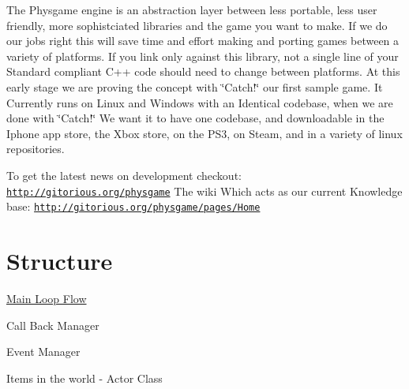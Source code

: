 The Physgame engine is an abstraction layer between less portable, less user friendly, more sophistciated libraries and the game you want to make. If we do our jobs right this will save time and effort making and porting games between a variety of platforms. If you link only against this library, not a single line of your Standard compliant C++ code should need to change between platforms. At this early stage we are proving the concept with \char`\"{}Catch!\char`\"{} our first sample game. It Currently runs on Linux and Windows with an Identical codebase, when we are done with \char`\"{}Catch!\char`\"{} We want it to have one codebase, and downloadable in the Iphone app store, the Xbox store, on the PS3, on Steam, and in a variety of linux repositories.

To get the latest news on development checkout: \href{http://gitorious.org/physgame}{\tt http://gitorious.org/physgame} The wiki Which acts as our current Knowledge base: \href{http://gitorious.org/physgame/pages/Home}{\tt http://gitorious.org/physgame/pages/Home}\hypertarget{index_Engine}{}\section{Structure}\label{index_Engine}
\hyperlink{mainloop1}{Main Loop Flow}

Call Back Manager

Event Manager

Items in the world -\/ Actor Class 